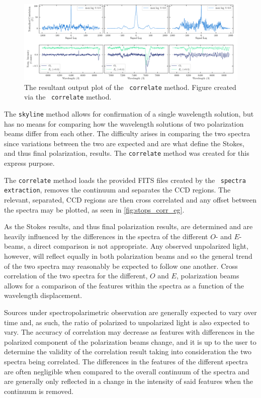 \begin{figure}[t]
    \centering
    \includegraphics[width = 1.0\textwidth]{figures/3_stops_correlate.png}
    \caption{The resultant output plot of the \stops\ \texttt{correlate} method. Figure created via the \stops\ \texttt{correlate} method.}
    \label{fig:stops_corr_eg}
\end{figure}

The \texttt{skyline} method allows for confirmation of a single wavelength solution, but has no means for comparing how the wavelength solutions of two polarization beams differ from each other. The difficulty arises in comparing the two spectra since variations between the two are expected and are what define the Stokes, and thus final polarization, results. The \texttt{correlate} method was created for this express purpose.

The \texttt{correlate} method loads the provided \gls{FITS} files created by the \polsalt\ \texttt{spectra extraction}, removes the continuum and separates the \gls{CCD} regions. The relevant, separated, \gls{CCD} regions are then cross correlated and any offset between the spectra may be plotted, as seen in \autoref{fig:stops_corr_eg}.

As the Stokes results, and thus final polarization results, are determined and are heavily influenced by the differences in the spectra of the different $O$- and $E$-beams, a direct comparison is not appropriate. Any observed unpolarized light, however, will reflect equally in both polarization beams and so the general trend of the two spectra may reasonably be expected to follow one another. Cross correlation of the two spectra for the different, $O$ and $E$, polarization beams allows for a comparison of the features within the spectra as a function of the wavelength displacement.

Sources under spectropolarimetric observation are generally expected to vary over time and, as such, the ratio of polarized to unpolarized light is also expected to vary. The accuracy of correlation may decrease as features with differences in the polarized component of the polarization beams change, and it is up to the user to determine the validity of the correlation result taking into consideration the two spectra being correlated. The differences in the features of the different spectra are often negligible when compared to the overall continuum of the spectra and are generally only reflected in a change in the intensity of said features when the continuum is removed.

